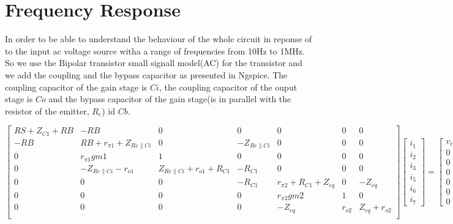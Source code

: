 \section{Frequency Response}

In order to be able to understand the behaviour of the whole circuit in reponse of to the input ac voltage source witha
a range of frequencies from 10Hz to 1MHz.
So we use the Bipolar transistor small signall model(AC) for the transistor and we add the coupling and the bypass capacitor as presented in
Ngspice. The coupling capacitor of the gain stage is $Ci$, the coupling capacitor of the ouput stage is $Co$ and the bypass
capacitor of the gain stage(is in parallel with the resistor of the emitter, $R_e$) id $Cb$.

\[
  \begin{bmatrix}
    RS + Z_{C1} + RB & -RB                                  & 0                                     & 0                    & 0                           & 0      & 0               \\
    -RB              & RB + r_{\pi 1} + Z_{Re \parallel Ci} & 0                                     & -Z_{Re \parallel Ci} & 0                           & 0      & 0               \\
    0                & r_{\pi 1} gm1                        & 1                                     & 0                    & 0                           & 0      & 0               \\
    0                & -Z_{Re     \parallel Ci} - r_{o1}    & Z_{Re \parallel Ci} + r_{o1} + R_{C1} & -R_{C1}              & 0                           & 0      & 0               \\
    0                & 0                                    & 0                                     & -R_{C1}              & r_{\pi 2} + R_{C1} + Z_{eq} & 0      & -Z_{eq}         \\
    0                & 0                                    & 0                                     & 0                    & r_{\pi 2} gm2               & 1      & 0               \\
    0                & 0                                    & 0                                     & 0                    & -Z_{eq}                     & r_{o2} & Z_{eq} + r_{o2} \\
  \end{bmatrix}
  \begin{bmatrix}
    i_1 \\ i_2  \\ i_3 \\ i_5 \\ i_6 \\ i_7
  \end{bmatrix}
  =
  \begin{bmatrix}
    v_{in} \\ 0 \\ 0 \\ 0 \\ 0  \\ 0 \\ 0
  \end{bmatrix}
\]

